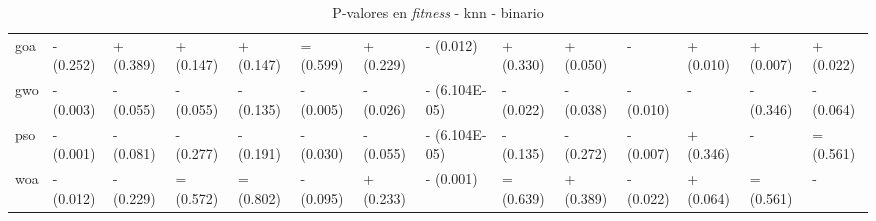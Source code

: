 \begin{table}
\begin{adjustbox}{width=\linewidth}
\begin{tabular}{llllllllllllll}
            goa   & - (0.252) & + (0.389) & + (0.147) & + (0.147)     & = (0.599) & + (0.229) & - (0.012)     & + (0.330) & + (0.050) & -         & + (0.010)     & + (0.007)     & + (0.022) \\
            gwo   & - (0.003) & - (0.055) & - (0.055) & - (0.135)     & - (0.005) & - (0.026) & - (6.104E-05) & - (0.022) & - (0.038) & - (0.010) & -             & - (0.346)     & - (0.064) \\
            pso   & - (0.001) & - (0.081) & - (0.277) & - (0.191)     & - (0.030) & - (0.055) & - (6.104E-05) & - (0.135) & - (0.272) & - (0.007) & + (0.346)     & -             & = (0.561) \\
            woa   & - (0.012) & - (0.229) & = (0.572) & = (0.802)     & - (0.095) & + (0.233) & - (0.001)     & = (0.639) & + (0.389) & - (0.022) & + (0.064)     & = (0.561)     & -         \\
            \bottomrule
        \end{tabular}
    \end{adjustbox}
    \caption{P-valores en \textit{fitness} - knn - binario}
\end{table}

